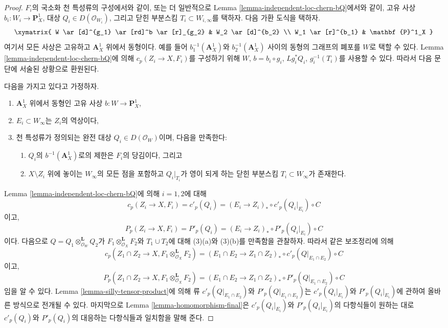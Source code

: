 \begin{proof}
$F_i$의 국소화 천 특성류의 구성에서와 같이, 또는 더 일반적으로
Lemma \ref{lemma-independent-loc-chern-bQ}에서와 같이, 고유 사상
$b_i : W_i \to \mathbf{P}^1_X$, 대상 $Q_i \in D(\mathcal{O}_{W_i})$,
그리고 닫힌 부분스킴 $T_i \subset W_{i, \infty}$를 택하자.
다음 가환 도식을 택하자.
$$
\xymatrix{
W \ar[d]^{g_1} \ar[rd]^b \ar[r]_{g_2} & W_2 \ar[d]^{b_2} \\
W_1 \ar[r]^{b_1} & \mathbf{P}^1_X
}
$$
여기서 모든 사상은 고유하고 $\mathbf{A}^1_X$ 위에서 동형이다.
예를 들어 $b_1^{-1}(\mathbf{A}^1_X)$와
$b_2^{-1}(\mathbf{A}^1_X)$ 사이의 동형의 그래프의 폐포를 $W$로
택할 수 있다. Lemma \ref{lemma-independent-loc-chern-bQ}에 의해
$c_p(Z_i \to X, F_i)$를 구성하기 위해 $W$, $b = b_i \circ g_i$,
$Lg_i^*Q_i$, $g_i^{-1}(T_i)$를 사용할 수 있다. 따라서 다음 문단에
서술된 상황으로 환원된다.

\medskip\noindent
다음을 가지고 있다고 가정하자.
\begin{enumerate}
\item $\mathbf{A}^1_X$ 위에서 동형인 고유 사상
$b : W \to \mathbf{P}^1_X$,
\item $E_i \subset W_\infty$는 $Z_i$의 역상이다,
\item 천 특성류가 정의되는 완전 대상 $Q_i \in D(\mathcal{O}_W)$이며,
다음을 만족한다:
\begin{enumerate}
\item $Q_i$의 $b^{-1}(\mathbf{A}^1_X)$로의 제한은 $F_i$의 당김이다,
그리고
\item $X \setminus Z_i$ 위에 놓이는 $W_\infty$의 모든 점을 포함하고
$Q_i|_{T_i}$가 영이 되게 하는 닫힌 부분스킴
$T_i \subset W_\infty$가 존재한다.
\end{enumerate}
\end{enumerate}
Lemma \ref{lemma-independent-loc-chern-bQ}에 의해 $i = 1, 2$에 대해
$$
c_p(Z_i \to X, F_i) = c'_p(Q_i) =
(E_i \to Z_i)_* \circ c'_p(Q_i|_{E_i}) \circ C
$$
이고,
$$
P_p(Z_i \to X, F_i) = P'_p(Q_i) =
(E_i \to Z_i)_* \circ P'_p(Q_i|_{E_i}) \circ C
$$
이다. 다음으로 $Q = Q_1 \otimes_{\mathcal{O}_W}^\mathbf{L} Q_2$가
$F_1 \otimes_{\mathcal{O}_X}^\mathbf{L} F_2$와 $T_1 \cup T_2$에 대해
(3)(a)와 (3)(b)를 만족함을 관찰하자. 따라서 같은 보조정리에 의해
$$
c_p(Z_1 \cap Z_2 \to X, F_1 \otimes_{\mathcal{O}_X}^\mathbf{L} F_2) =
(E_1 \cap E_2 \to Z_1 \cap Z_2)_* \circ
c'_p(Q|_{E_1 \cap E_2}) \circ C
$$
이고,
$$
P_p(Z_1 \cap Z_2 \to X, F_1 \otimes_{\mathcal{O}_X}^\mathbf{L} F_2) =
(E_1 \cap E_2 \to Z_1 \cap Z_2)_* \circ
P'_p(Q|_{E_1 \cap E_2}) \circ C
$$
임을 알 수 있다. Lemma \ref{lemma-silly-tensor-product}에 의해
류 $c'_p(Q|_{E_1 \cap E_2})$와 $P'_p(Q|_{E_1 \cap E_2})$는
$c'_p(Q_i|_{E_i})$와 $P'_p(Q_i|_{E_i})$에 관하여 올바른 방식으로
전개될 수 있다. 마지막으로 Lemma \ref{lemma-homomorphism-final}은
$c'_p(Q_i|_{E_i})$와 $P'_p(Q_i|_{E_i})$의 다항식들이 원하는 대로
$c'_p(Q_i)$와 $P'_p(Q_i)$의 대응하는 다항식들과 일치함을 말해 준다.
\end{proof}






